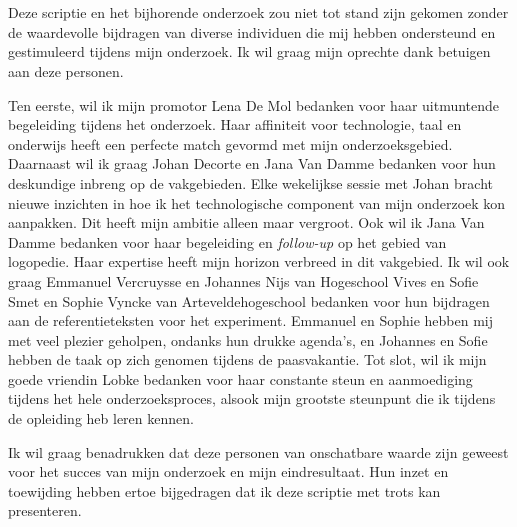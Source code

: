 
\chapter*{}%
\label{ch:voorwoord}

Deze scriptie en het bijhorende onderzoek zou niet tot stand zijn gekomen zonder de waardevolle bijdragen van diverse individuen die mij hebben ondersteund en gestimuleerd tijdens mijn onderzoek. Ik wil graag mijn oprechte dank betuigen aan deze personen.

\medspace

Ten eerste, wil ik mijn promotor Lena De Mol bedanken voor haar uitmuntende begeleiding tijdens het onderzoek. Haar affiniteit voor technologie, taal en onderwijs heeft een perfecte match gevormd met mijn onderzoeksgebied. Daarnaast wil ik graag Johan Decorte en Jana Van Damme bedanken voor hun deskundige inbreng op de vakgebieden. Elke wekelijkse sessie met Johan bracht nieuwe inzichten in hoe ik het technologische component van mijn onderzoek kon aanpakken. Dit heeft mijn ambitie alleen maar vergroot. Ook wil ik Jana Van Damme bedanken voor haar begeleiding en \textit{follow-up} op het gebied van logopedie. Haar expertise heeft mijn horizon verbreed in dit vakgebied. Ik wil ook graag Emmanuel Vercruysse en Johannes Nijs van Hogeschool Vives en Sofie Smet en Sophie Vyncke van Arteveldehogeschool bedanken voor hun bijdragen aan de referentieteksten voor het experiment. Emmanuel en Sophie hebben mij met veel plezier geholpen, ondanks hun drukke agenda's, en Johannes en Sofie hebben de taak op zich genomen tijdens de paasvakantie. Tot slot, wil ik mijn goede vriendin Lobke bedanken voor haar constante steun en aanmoediging tijdens het hele onderzoeksproces, alsook mijn grootste steunpunt die ik tijdens de opleiding heb leren kennen.

\medspace

Ik wil graag benadrukken dat deze personen van onschatbare waarde zijn geweest voor het succes van mijn onderzoek en mijn eindresultaat. Hun inzet en toewijding hebben ertoe bijgedragen dat ik deze scriptie met trots kan presenteren.